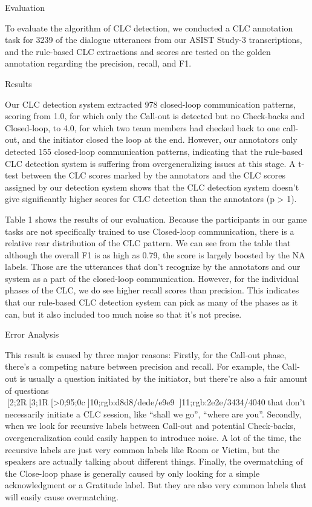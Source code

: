 Evaluation

To evaluate the algorithm of CLC detection, we conducted a CLC annotation task
for 3239 of the dialogue utterances from our ASIST Study-3 transcriptions, and
the rule-based CLC extractions and scores are tested on the golden annotation
regarding the precision, recall, and F1.


Results

Our CLC detection system extracted 978 closed-loop communication patterns,
scoring from 1.0, for which only the Call-out is detected but no Check-backs
and Closed-loop, to 4.0, for which two team members had checked back to one
call-out, and the initiator closed the loop at the end. However, our annotators
only detected 155 closed-loop communication patterns, indicating that the
rule-based CLC detection system is suffering from overgeneralizing issues at
this stage. A t-test between the CLC scores marked by the annotators and the
CLC scores assigned by our detection system shows that the CLC detection system
doesn’t give significantly higher scores for CLC detection than the annotators
(p > 1). 

Table 1 shows the results of our evaluation. Because the participants in our
game tasks are not specifically trained to use Closed-loop communication, there
is a relative rear distribution of the CLC pattern. We can see from the table
that although the overall F1 is as high as 0.79, the score is largely boosted
by the NA labels. Those are the utterances that don’t recognize by the
annotators and our system as a part of the closed-loop communication.  However,
for the individual phases of the CLC, we do see higher recall scores than
precision. This indicates that our rule-based CLC detection system can pick as
many of the phases as it can, but it also included too much noise so that it’s
not precise. 

Error Analysis

This result is caused by three major reasons: Firstly, for the Call-out phase,
there’s a competing nature between precision and recall. For example, the
Call-out is usually a question initiated by the initiator, but there're also a
fair amount of questions
[2;2R[3;1R[>0;95;0c]10;rgb:d8d8/dede/e9e9]11;rgb:2e2e/3434/4040that
don’t necessarily initiate a CLC session, like “shall we go”, “where are you”.
Secondly, when we look for recursive labels between Call-out and potential
Check-backs, overgeneralization could easily happen to introduce noise. A lot
of the time, the recursive labels are just very common labels like Room or
Victim, but the speakers are actually talking about different things. Finally,
the overmatching of the Close-loop phase is generally caused by only looking
for a simple acknowledgment or a Gratitude label. But they are also very common
labels that will easily cause overmatching.




